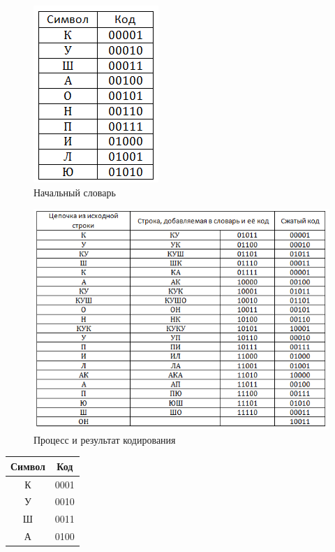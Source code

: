 \begin{figure}[H]
	\begin{center}
		\includegraphics[scale=1]{../pics/LZW/dictionary.png}
		\caption{Начальный словарь} 
		\label{pic:lzw:dictionary}
	\end{center}
\end{figure}

\begin{figure}[H]
	\begin{center}
		\includegraphics[scale=1]{../pics/LZW/result.png}
		\caption{Процесс и результат кодирования}
		\label{pic:lzw:result}
	\end{center}
\end{figure}

\renewcommand{\arraystretch}{1.5}
\begin{table}[H]
\begin{center}
	\begin{tabular}{|c|c|}
		\hline	
		Символ & Код \\
		\hline
		  К    & 0001 \\
		\hline
		  У	   & 0010 \\
		\hline  
	  	  Ш	   & 0011 \\
		\hline  	
		  А    & 0100 \\
		\hline
	\end{tabular}
\end{center}
\end{table}

